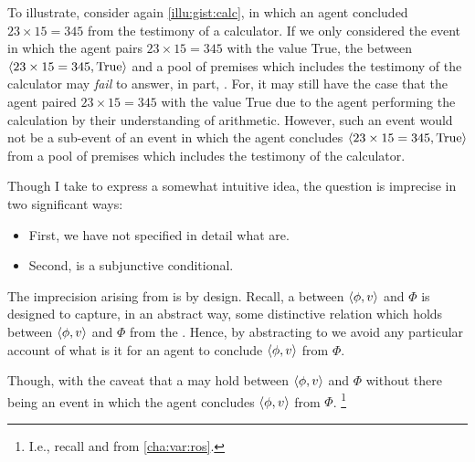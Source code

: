 \begin{note}
  To illustrate, consider again \autoref{illu:gist:calc}, in which an agent concluded \(23 \times 15 = 345\) from the testimony of a calculator.
  If we only considered the event in which the agent pairs \(23 \times 15 = 345\) with the value True, the \ros{} between \(\langle 23 \times 15 = 345, \text{True} \rangle\) and a pool of premises which includes the testimony of the calculator may \emph{fail} to answer, in part, \qWhyVnP{}.
  For, it may still have the case that the agent paired \(23 \times 15 = 345\) with the value True due to the agent performing the calculation by their understanding of arithmetic.
  However, such an event would not be a sub-event of an event in which the agent concludes \(\langle 23 \times 15 = 345, \text{True} \rangle\) from a pool of premises which includes the testimony of the calculator.
\end{note}

\begin{note}
  Though I take \qWhyVnP{} to express a somewhat intuitive idea, the question is imprecise in two significant ways:
  \begin{itemize}[noitemsep]
  \item
    First, we have not specified in detail what \ros{} are.
  \item
    Second, \qWVitc{} is a subjunctive conditional.
  \end{itemize}
\end{note}

\begin{note}
  The imprecision arising from  is by design.
  Recall, a \ros{} between \(\langle \phi, v \rangle\) and \(\Phi\) is designed to capture, in an abstract way, some distinctive relation which holds between \(\langle \phi, v \rangle\) and \(\Phi\) from the \agpe{}.
  Hence, by abstracting to  we avoid any particular account of what is it for an agent to conclude \(\langle \phi, v \rangle\) from \(\Phi\).

  Though, with the caveat that a \ros{} may hold between \(\langle \phi, v \rangle\) and \(\Phi\) without there being an event in which the agent concludes \(\langle \phi, v \rangle\) from \(\Phi\).%
  \footnote{
    I.e., recall \supportI{} and \supportII{} from \autoref{cha:var:ros}.
  }
\end{note}


